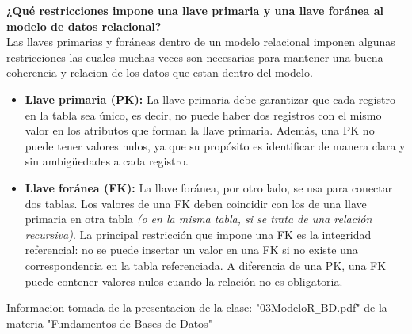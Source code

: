 \textbf{¿Qué restricciones impone una llave primaria y una llave foránea al modelo de datos relacional?}\vspace{.3cm} \\

Las llaves primarias y foráneas dentro de un modelo relacional imponen algunas restricciones las cuales muchas veces son necesarias para mantener una buena coherencia y relacion de los datos que estan dentro del modelo.

\begin{itemize}
    \item \textbf{Llave primaria (PK):} La llave primaria debe garantizar que cada registro en la tabla sea único, es decir, no puede haber dos registros con el mismo valor en los atributos que forman la llave primaria. Además, una PK no puede tener valores nulos, ya que su propósito es identificar de manera clara y sin ambigüedades a cada registro. \\
    
    \item \textbf{Llave foránea (FK):} La llave foránea, por otro lado, se usa para conectar dos tablas. Los valores de una FK deben coincidir con los de una llave primaria en otra tabla \textit{(o en la misma tabla, si se trata de una relación recursiva)}. La principal restricción que impone una FK es la integridad referencial: no se puede insertar un valor en una FK si no existe una correspondencia en la tabla referenciada. A diferencia de una PK, una FK puede contener valores nulos cuando la relación no es obligatoria. \\
\end{itemize}

Informacion tomada de la presentacion de la clase: "03ModeloR\texttt{\_}BD.pdf" de la materia "Fundamentos de Bases de Datos" \\